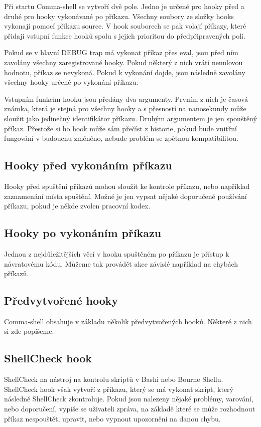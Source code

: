 \documentclass[thesis=M,czech]{FITthesis}[2012/06/26]
\begin{document}
Při startu Comma-shell se vytvoří dvě pole. Jedno je určené pro hooky před a druhé pro hooky vykonávané po příkazu. Všechny soubory ze složky hooks vykonají pomocí příkazu source. V hook souborech se pak volají příkazy, které přidají vstupní funkce hooků spolu s jejich prioritou do předpřipravených polí.

Pokud se v hlavní DEBUG trap má vykonat příkaz přes eval, jsou před ním zavolány všechny zaregistrované hooky. Pokud některý z nich vrátí nenulovou hodnotu, příkaz se nevykoná. Pokud k vykonání dojde, jsou následně zavolány všechny hooky určené po vykonání příkazu.

Vstupním funkcím hooku jsou předány dva argumenty. Prvním z nich je časová známka, která je stejná pro všechny hooky a s přesností na nanosekundy může sloužit jako jedinečný identifikátor příkazu. Druhým argumentem je jen spouštěný příkaz. Přestože si ho hook může sám přečíst z historie, pokud bude vnitřní fungování v budoucnu změněno, nebude problém se zpětnou kompatibilitou.

\subsection{Hooky před vykonáním příkazu}

Hooky před spuštění příkazů mohou sloužit ke kontrole příkazu, nebo například zaznamenání místa spuštění. Možné je jen vypsat nějaké doporučené používání příkazu, pokud je někde zvolen pracovní kodex.

\subsection{Hooky po vykonáním příkazu}

Jednou z nejdůležitějších věcí v hooku spuštěném po příkazu je přístup k návratovému kódu. Můžeme tak provádět akce závislé například na chybách příkazů.

\subsection{Předvytvořené hooky}

Comma-shell obsahuje v základu několik předvytvořených hooků. Některé z nich si zde popíšeme.


%
\subsection{ShellCheck hook}

ShellCheck na nástroj na kontrolu skriptů v Bashi nebo Bourne Shellu. ShellCheck hook však vytvoří z příkazu, který se má vykonat skript, který následně ShellCheck zkontroluje. Pokud jsou nalezeny nějaké problémy, varování, nebo doporučení, vypíše se uživateli zpráva, na základě které se může rozhodnout příkaz nespouštět, upravit, nebo vypnout upozornění na danou chybu.
\end{document}
